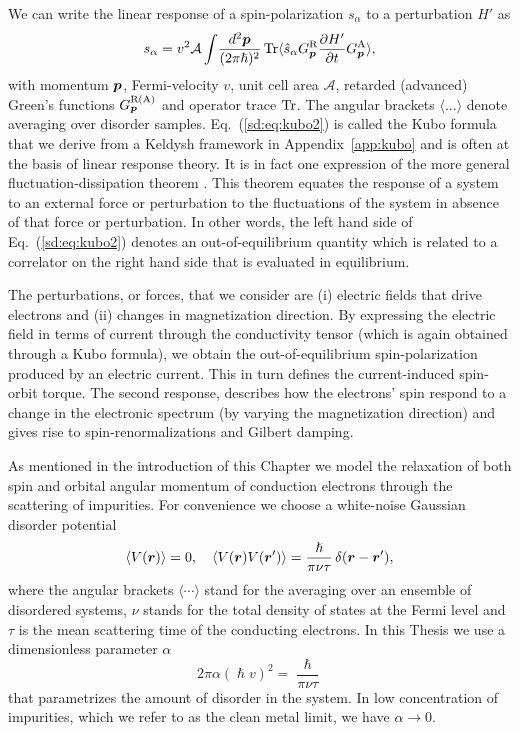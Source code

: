 We can write the linear response of a spin-polarization $s_\alpha$ to a perturbation $H'$ as
\begin{equation}
	s_\alpha = v^2\mathcal{A}\int\!\frac{d^2\boldsymbol{p}}{(2\pi\hslash)^2}\operatorname{Tr} \langle \hat{s}_\alpha G^\text{R}_{\boldsymbol{p}} \frac{\partial H'}{\partial t} G^\text{A}_{\boldsymbol{p}}\rangle,
\label{sd:eq:kubo2}
\end{equation}
with momentum $\boldsymbol{p}$, Fermi-velocity $v$, unit cell area $\mathcal{A}$, retarded (advanced) Green's functions $G^\text{R(A)}_{\boldsymbol{p}}$ and operator trace $\operatorname{Tr}$. The angular brackets $\langle\dots\rangle$ denote averaging over disorder samples. Eq.~(\ref{sd:eq:kubo2}) is called the Kubo formula that we derive from a Keldysh framework in Appendix~\ref{app:kubo} and is often at the basis of linear response theory. It is in fact one expression of the more general fluctuation-dissipation theorem \cite{Kubo_1966}. This theorem equates the response of a system to an external force or perturbation to the fluctuations of the system in absence of that force or perturbation. In other words, the left hand side of Eq.~(\ref{sd:eq:kubo2}) denotes an out-of-equilibrium quantity which is related to a correlator on the right hand side that is evaluated in equilibrium. 

The perturbations, or forces, that we consider are (i) electric fields that drive electrons and (ii) changes in magnetization direction. By expressing the electric field in terms of current through the conductivity tensor (which is again obtained through a Kubo formula), we obtain the out-of-equilibrium spin-polarization produced by an electric current. This in turn defines the current-induced spin-orbit torque. The second response, describes how the electrons' spin respond to a change in the electronic spectrum (by varying the magnetization direction) and gives rise to spin-renormalizations and Gilbert damping. 

As mentioned in the introduction of this Chapter we model the relaxation of both spin and orbital angular momentum of conduction electrons through the scattering of impurities. For convenience we choose a white-noise Gaussian disorder potential
\begin{equation}
    \label{disorder}
\langle V(\boldsymbol{r})\rangle =0,\quad \langle V(\boldsymbol{r}) V(\boldsymbol{r}') \rangle = \frac{\hslash}{\pi\nu\tau}\,\delta(\boldsymbol{r}-\boldsymbol{r}'),
\end{equation}
where the angular brackets $\langle\cdots\rangle$ stand for the averaging over an ensemble of disordered systems, $\nu$ stands for the total density of states at the Fermi level and $\tau$ is the mean scattering time of the conducting electrons. In this Thesis we use a dimensionless parameter $\alpha$
\begin{equation}
     2 \pi\alpha (\hslash v)^2 = \frac{\hslash}{\pi\nu\tau}
\end{equation}
that parametrizes the amount of disorder in the system. In low concentration of impurities, which we refer to as the clean metal limit, we have $\alpha\rightarrow0$. 

